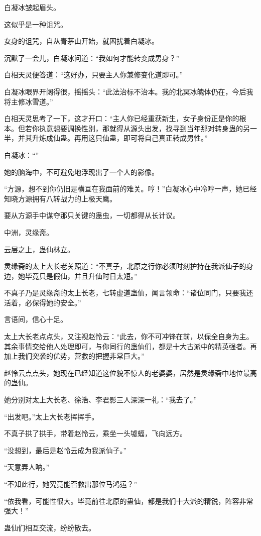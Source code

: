 \begin{this_body}
白凝冰皱起眉头。

这似乎是一种诅咒。

女身的诅咒，自从青茅山开始，就困扰着白凝冰。

沉默了一会儿，白凝冰问道：“我如何才能转变成男身？”

白相天灵便答道：“这好办，只要主人你兼修变化道即可。”

白凝冰眼界开阔得很，摇摇头：“此法治标不治本。我的北冥冰魄体仍在，今后我将主修冰雪道。”

白相天灵思考了一下，这才开口：“主人你已经重获新生，女子身份正是你的根本。但若你执意想要调换性别，那就得从源头出发，找寻到当年那对转身蛊的另一半，并其升炼成仙蛊。再用这只仙蛊，即可将自己真正转成男性。”

白凝冰：“”

她的脑海中，不可避免地浮现出了一个人的影像。

“方源，想不到你仍旧是横亘在我面前的难关。哼！”白凝冰心中冷哼一声，她已经知晓方源拥有八转战力的上极天鹰。

要从方源手中谋夺那只关键的蛊虫，一切都得从长计议。

中洲，灵缘斋。

云层之上，蛊仙林立。

灵缘斋的太上大长老关照道：“不真子，北原之行你必须时刻护持在我派仙子的身边，她毕竟只是假仙，并且升仙时日太短。”

不真子乃是灵缘斋的太上长老，七转虚道蛊仙，闻言领命：“诸位同门，只要我还活着，必保得她的安全。”

言语间，信心十足。

太上大长老点点头，又注视赵怜云：“此去，你不可冲锋在前，以保全自身为主。其余事情交给他人处理即可，与你同行的蛊仙们，都是十大古派中的精英强者。再加上我们突袭的优势，营救的把握非常巨大。”

赵怜云点点头，她现在已经知道这位貌不惊人的老婆婆，居然是灵缘斋中地位最高的蛊仙。

她分别对太上大长老、徐浩、李君影三人深深一礼：“我去了。”

“出发吧。”太上大长老挥挥手。

不真子拱了拱手，带着赵怜云，乘坐一头墟蝠，飞向远方。

“没想到，最后是赵怜云成为我派仙子。”

“天意弄人呐。”

“不知此行，她究竟能否救出那位马鸿运？”

“依我看，可能性很大。毕竟前往北原的蛊仙，都是我们十大派的精锐，阵容非常强大！”

蛊仙们相互交流，纷纷散去。


\end{this_body}
